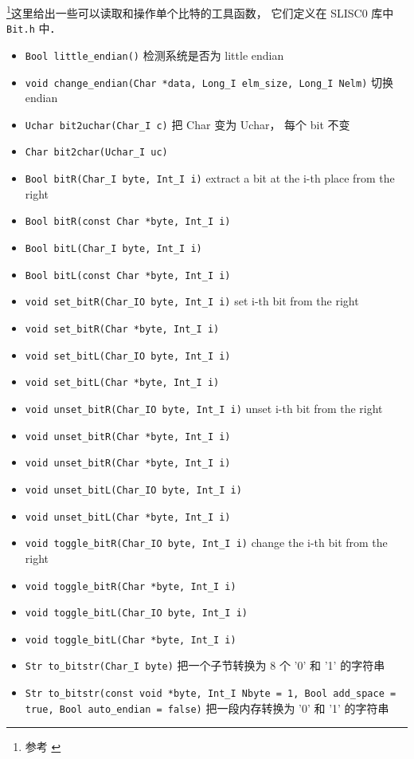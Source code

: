 
\footnote{参考 \cite{NR3}}这里给出一些可以读取和操作单个比特的工具函数， 它们定义在 SLISC0 库中 \verb|Bit.h| 中．

\begin{itemize}
\item \verb|Bool little_endian()| 检测系统是否为 little endian
\item \verb|void change_endian(Char *data, Long_I elm_size, Long_I Nelm)| 切换 endian
\item \verb|Uchar bit2uchar(Char_I c)| 把 Char 变为 Uchar， 每个 bit 不变
\item \verb|Char bit2char(Uchar_I uc)|
\item \verb|Bool bitR(Char_I byte, Int_I i)| extract a bit at the i-th place from the right
\item \verb|Bool bitR(const Char *byte, Int_I i)|
\item \verb|Bool bitL(Char_I byte, Int_I i)|
\item \verb|Bool bitL(const Char *byte, Int_I i)|
\item \verb|void set_bitR(Char_IO byte, Int_I i)| set i-th bit from the right
\item \verb|void set_bitR(Char *byte, Int_I i)|
\item \verb|void set_bitL(Char_IO byte, Int_I i)|
\item \verb|void set_bitL(Char *byte, Int_I i)|
\item \verb|void unset_bitR(Char_IO byte, Int_I i)| unset i-th bit from the right
\item \verb|void unset_bitR(Char *byte, Int_I i)|
\item \verb|void unset_bitR(Char *byte, Int_I i)|
\item \verb|void unset_bitL(Char_IO byte, Int_I i)|
\item \verb|void unset_bitL(Char *byte, Int_I i)|
\item \verb|void toggle_bitR(Char_IO byte, Int_I i)| change the i-th bit from the right
\item \verb|void toggle_bitR(Char *byte, Int_I i)|
\item \verb|void toggle_bitL(Char_IO byte, Int_I i)|
\item \verb|void toggle_bitL(Char *byte, Int_I i)|
\item \verb|Str to_bitstr(Char_I byte)| 把一个子节转换为 8 个 '0' 和 '1' 的字符串
\item \verb|Str to_bitstr(const void *byte, Int_I Nbyte = 1, Bool add_space = true, Bool auto_endian = false)| 把一段内存转换为 '0' 和 '1' 的字符串

\end{itemize}
